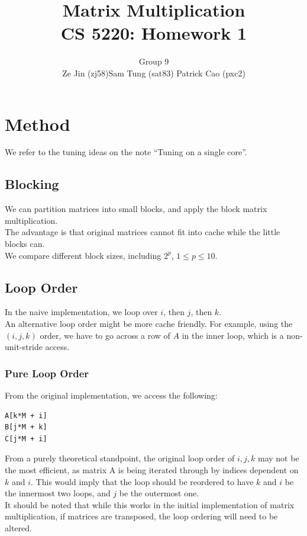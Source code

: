 \documentclass[12pt]{article}
\numberwithin{equation}{section}
\begin{document}
\title{\bf{Matrix Multiplication \\ CS 5220: Homework 1}}

\author{Group 9 \\ Ze Jin (zj58)\quad Sam Tung (sat83) \quad Patrick Cao (pxc2) \\}

\date{ }

\maketitle





\section{Method}

We refer to the tuning ideas on the note ``Tuning on a single core''.

\subsection{Blocking}

We can partition matrices into small blocks, and apply the block matrix multiplication.
\\
The advantage is that original matrices cannot fit into cache while the little blocks can.
\\
We compare different block sizes, including $2^p$, $1 \leq p \leq 10$.

\subsection{Loop Order}

In the naive implementation, we loop over $i$, then $j$, then $k$.
\\
An alternative loop order might be more cache friendly. For example, using the $(i, j, k)$ order, we have to go across a row of $A$ in the inner loop, which is a non-unit-stride access.

\subsubsection{Pure Loop Order}

From the original implementation, we access the following:
\begin{verbatim}
A[k*M + i]
B[j*M + k]
C[j*M + i]
\end{verbatim}
From a purely theoretical standpoint, the original loop order of $i,j,k$ may not be the most efficient, as matrix A is being iterated through by indices dependent on $k$ and $i$. This would imply that the loop should be reordered to have $k$ and $i$ be the innermost two loops, and $j$ be the outermost one.
\\
It should be noted that while this works in the initial implementation of matrix multiplication, if matrices are transposed, the loop ordering will need to be altered.
\end{document}
